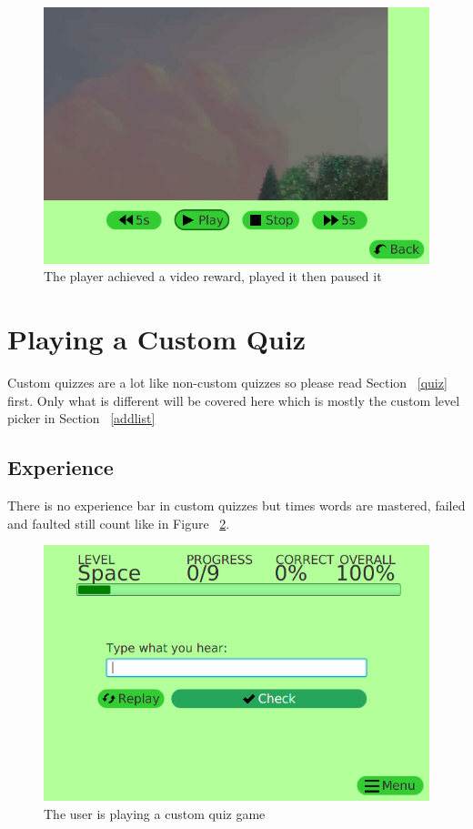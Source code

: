 \documentclass[12pt,a4paper,titlepage,onecolumn]{article}
\begin{document}
	\begin{figure}
		\centering
		\includegraphics[width=1\linewidth]{Figures/NewQuiz/VideoReward/VideoRewardPaused}
		\caption[Video Reward Paused]{The player achieved a video reward, played it then paused it}
		\label{fig:VideoRewardPaused}
	\end{figure}
	
	
	\section{Playing a Custom Quiz}
	Custom quizzes are a lot like non-custom quizzes so please read Section ~\ref{quiz} first. Only what is different will be covered here which is mostly the custom level picker in Section ~\ref{addlist}
	\subsection{Experience}
	There is no experience bar in custom quizzes but times words are mastered, failed and faulted still count like in Figure ~\ref{fig:CustomQuiz}.
	\begin{figure}[h]
		\centering
		\includegraphics[width=1\linewidth]{Figures/CustomQuiz/CustomQuiz}
		\caption[Custom Quiz]{The user is playing a custom quiz game}
		\label{fig:CustomQuiz}
	\end{figure}
\end{document}
